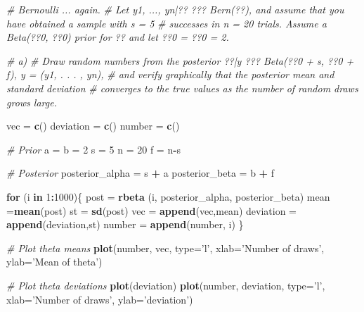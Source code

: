 \documentclass[]{article}
\newenvironment{Shaded}{\begin{snugshade}}{\end{snugshade}}
\newcommand{\CommentTok}[1]{\textcolor[rgb]{0.56,0.35,0.01}{\textit{#1}}}
\newcommand{\ControlFlowTok}[1]{\textcolor[rgb]{0.13,0.29,0.53}{\textbf{#1}}}
\newcommand{\DataTypeTok}[1]{\textcolor[rgb]{0.13,0.29,0.53}{#1}}
\newcommand{\DecValTok}[1]{\textcolor[rgb]{0.00,0.00,0.81}{#1}}
\newcommand{\KeywordTok}[1]{\textcolor[rgb]{0.13,0.29,0.53}{\textbf{#1}}}
\newcommand{\NormalTok}[1]{#1}
\newcommand{\OperatorTok}[1]{\textcolor[rgb]{0.81,0.36,0.00}{\textbf{#1}}}
\newcommand{\StringTok}[1]{\textcolor[rgb]{0.31,0.60,0.02}{#1}}
\begin{document}
\begin{Shaded}
\begin{Highlighting}[]
\CommentTok{# Bernoulli ... again.}
\CommentTok{# Let y1, ..., yn|?? ??? Bern(??), and assume that you have obtained a sample with s = 5}
\CommentTok{# successes in n = 20 trials. Assume a Beta(??0, ??0) prior for ?? and let ??0 = ??0 = 2.}

\CommentTok{# a)}
\CommentTok{# Draw random numbers from the posterior ??|y ??? Beta(??0 + s, ??0 + f), y = (y1, . . . , yn), }
\CommentTok{# and verify graphically that the posterior mean and standard deviation}
\CommentTok{# converges to the true values as the number of random draws grows large.}

\NormalTok{vec =}\StringTok{ }\KeywordTok{c}\NormalTok{()}
\NormalTok{deviation =}\StringTok{ }\KeywordTok{c}\NormalTok{()}
\NormalTok{number =}\StringTok{ }\KeywordTok{c}\NormalTok{()}

\CommentTok{# Prior}
\NormalTok{a =}\StringTok{ }\NormalTok{b =}\StringTok{ }\DecValTok{2}
\NormalTok{s =}\StringTok{ }\DecValTok{5}
\NormalTok{n =}\StringTok{ }\DecValTok{20}
\NormalTok{f =}\StringTok{ }\NormalTok{n}\OperatorTok{-}\NormalTok{s}

\CommentTok{# Posterior}
\NormalTok{posterior_alpha =}\StringTok{ }\NormalTok{s }\OperatorTok{+}\StringTok{ }\NormalTok{a}
\NormalTok{posterior_beta =}\StringTok{ }\NormalTok{b }\OperatorTok{+}\StringTok{ }\NormalTok{f}

\ControlFlowTok{for}\NormalTok{ (i }\ControlFlowTok{in} \DecValTok{1}\OperatorTok{:}\DecValTok{1000}\NormalTok{)\{}
\NormalTok{  post =}\StringTok{ }\KeywordTok{rbeta}\NormalTok{ (i, posterior_alpha, posterior_beta)}
\NormalTok{  mean =}\KeywordTok{mean}\NormalTok{(post)}
\NormalTok{  st =}\StringTok{ }\KeywordTok{sd}\NormalTok{(post)}
\NormalTok{  vec =}\StringTok{ }\KeywordTok{append}\NormalTok{(vec,mean)}
\NormalTok{  deviation =}\StringTok{ }\KeywordTok{append}\NormalTok{(deviation,st)}
\NormalTok{  number =}\StringTok{ }\KeywordTok{append}\NormalTok{(number, i)}
\NormalTok{\}}

\CommentTok{# Plot theta means}
\KeywordTok{plot}\NormalTok{(number, vec, }\DataTypeTok{type=}\StringTok{'l'}\NormalTok{, }\DataTypeTok{xlab=}\StringTok{'Number of draws'}\NormalTok{, }\DataTypeTok{ylab=}\StringTok{'Mean of theta'}\NormalTok{)}

\CommentTok{# Plot theta deviations}
\KeywordTok{plot}\NormalTok{(deviation)}
\KeywordTok{plot}\NormalTok{(number, deviation, }\DataTypeTok{type=}\StringTok{'l'}\NormalTok{, }\DataTypeTok{xlab=}\StringTok{'Number of draws'}\NormalTok{, }\DataTypeTok{ylab=}\StringTok{'deviation'}\NormalTok{)}


\end{Highlighting}
\end{Shaded}
\end{document}
